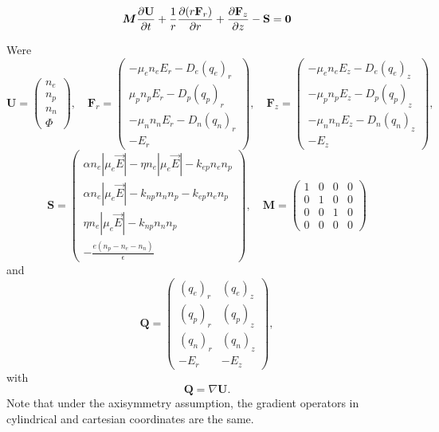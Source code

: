 \documentclass[12pt, a4paper]{report}
\begin{document}
\begin{center}
\[
{\bm M} \frac{\partial {\bf U}}{\partial t} +  \frac{1}{r} \frac{\partial (r {\bf F}_r)}{\partial r} +  \frac{\partial {\bf F}_z}{\partial z} -  {\bf S}  = {\bf 0}
\]
\end{center}
Were
\begin{equation} 
{\bm U} = \left( \begin{array}{c} n_e \\ n_p \\ n_n \\ \Phi \end{array} \right),  \quad {\bm F}_r = \left( \begin{array}{c} - \mu_e n_e E_r - D_e (q_e)_r \\ \mu_p n_p E_r - D_p (q_p)_r \\ -\mu_n n_n E_r - D_n (q_n)_r \\ -E_r \end{array} \right),  \quad {\bm F}_z = \left( \begin{array}{c} - \mu_e n_e E_z - D_e (q_e)_z \\ -\mu_p n_p E_z - D_p (q_p)_z \\ -\mu_n n_n E_z - D_n (q_n)_z \\ -E_z \end{array} \right),
\end{equation}
\begin{equation} 
{\bm S} = \left( \begin{array}{c} \alpha n_e|\mu_e\vec{E}| -\eta n_e|\mu_e\vec{E}| - k_{ep}n_en_p \\ \alpha n_e|\mu_e\vec{E}| - k_{np}n_nn_p - k_{ep}n_en_p \\ \eta n_e|\mu_e\vec{E}| - k_{np}n_nn_p \\ -\frac{e(n_p-n_e-n_n)}{\epsilon} \end{array} \right),  \quad {\bm M} = \left( \begin{array}{cccc} 
1 & 0 & 0 & 0 \\
0 & 1 & 0 & 0 \\
0 & 0 & 1 & 0 \\
0 & 0 & 0 & 0 \end{array} \right)
\end{equation}
and
\begin{equation} 
{\bm Q} = \left( \begin{array}{cc} (q_e)_r & (q_e)_z \\ (q_p)_r & (q_p)_z \\ (q_n)_r & (q_n)_z \\ -E_r & -E_z \end{array} \right),  
\end{equation}
with 
\begin{equation} 
{\bm Q} = \nabla {\bm U}.
\end{equation}
Note that under the  axisymmetry assumption, the gradient operators in cylindrical and cartesian coordinates are the same.
\end{document}
